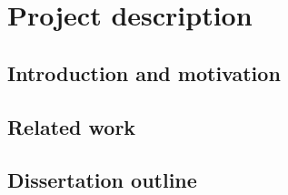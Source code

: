 \documentclass[report.tex]{subfiles}
\begin{document}
\section{Project description}

\subsection{Introduction and motivation}

\subsection{Related work}

\subsection{Dissertation outline}
\end{document}
